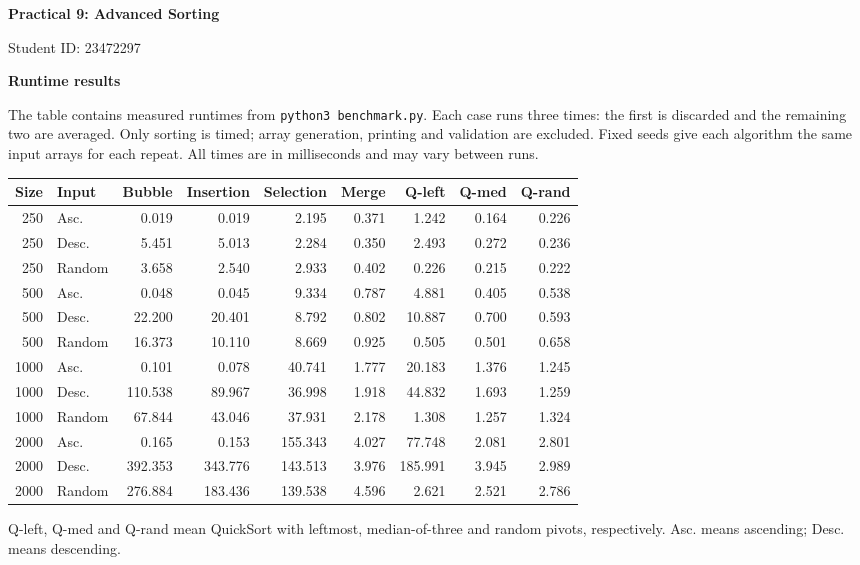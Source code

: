 \documentclass[11pt,a4paper]{article}
\begin{document}
{\Large\bfseries Practical 9: Advanced Sorting}\par
Student ID: 23472297

\textbf{Runtime results}

The table contains measured runtimes from \texttt{python3 benchmark.py}.
Each case runs three times: the first is discarded and the remaining two
are averaged. Only sorting is timed; array generation, printing and
validation are excluded. Fixed seeds give each algorithm the same input
arrays for each repeat. All times are in milliseconds and may vary between runs.

\begin{center}
\small
\setlength{\tabcolsep}{4pt}
\begin{tabular}{@{}rlrrrrrrr@{}}
\toprule
Size & Input & Bubble & Insertion & Selection & Merge & Q-left & Q-med & Q-rand \\
\midrule
250 & Asc. & 0.019 & 0.019 & 2.195 & 0.371 & 1.242 & 0.164 & 0.226 \\
250 & Desc. & 5.451 & 5.013 & 2.284 & 0.350 & 2.493 & 0.272 & 0.236 \\
250 & Random & 3.658 & 2.540 & 2.933 & 0.402 & 0.226 & 0.215 & 0.222 \\
\midrule
500 & Asc. & 0.048 & 0.045 & 9.334 & 0.787 & 4.881 & 0.405 & 0.538 \\
500 & Desc. & 22.200 & 20.401 & 8.792 & 0.802 & 10.887 & 0.700 & 0.593 \\
500 & Random & 16.373 & 10.110 & 8.669 & 0.925 & 0.505 & 0.501 & 0.658 \\
\midrule
1000 & Asc. & 0.101 & 0.078 & 40.741 & 1.777 & 20.183 & 1.376 & 1.245 \\
1000 & Desc. & 110.538 & 89.967 & 36.998 & 1.918 & 44.832 & 1.693 & 1.259 \\
1000 & Random & 67.844 & 43.046 & 37.931 & 2.178 & 1.308 & 1.257 & 1.324 \\
\midrule
2000 & Asc. & 0.165 & 0.153 & 155.343 & 4.027 & 77.748 & 2.081 & 2.801 \\
2000 & Desc. & 392.353 & 343.776 & 143.513 & 3.976 & 185.991 & 3.945 & 2.989 \\
2000 & Random & 276.884 & 183.436 & 139.538 & 4.596 & 2.621 & 2.521 & 2.786 \\
\bottomrule
\end{tabular}
\end{center}

Q-left, Q-med and Q-rand mean QuickSort with leftmost, median-of-three
and random pivots, respectively. Asc. means ascending; Desc. means descending.
\end{document}
